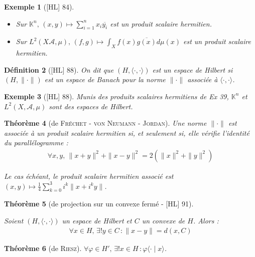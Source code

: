 \documentclass[10pt, a4paper, parskip=full, twoside, twocolumn]{report}
\newtheorem{definition}{Définition}
\newtheorem{theorem}[definition]{Théorème}
\newtheorem{example}[definition]{Exemple}
\newcommand{\IK}{\mathbb{K}}
\newcommand{\A}{\mathcal{A}}
\begin{document}
\begin{example}[\textnormal{[HL] 84}]
	\begin{itemize}
		\item Sur $\IK^n,\, (x,y)\mapsto \sum_{i=1}^{n} x_i \overline{y_i}$ est un produit scalaire hermitien.
		\item Sur $L^2(X\A,\mu),\, (f,g)\mapsto \int_Xf(x)\overline{g(x)}d\mu(x)$ est un produit scalaire hermitien.
	\end{itemize}
\end{example}

\begin{definition}[\textnormal{[HL] 88}]
	On dit que $(H, \langle\cdot,\cdot\rangle)$ est un \emph{espace de Hilbert} si $(H,\|\cdot\|)$ est 
	un espace de Banach pour la norme $\|\cdot\|$ associée à $\langle\cdot,\cdot\rangle$.
\end{definition}

\begin{example}[\textnormal{[HL] 88}]
	Munis des produits scalaires hermitiens de Ex 39, $\IK^n$ et $L^2(X,\A,\mu)$ sont des espaces de Hilbert.
\end{example}

\begin{theorem}[de \textsc{Fréchet - von Neumann - Jordan}]
	Une norme $\|\cdot\|$ est associée à un produit scalaire hermitien si, et seulement si, elle vérifie l'identité du parallélogramme :
	\begin{align*}
		\forall x,y,\, \|x+y\|^2 + \|x-y\|^2 = 2(\|x\|^2 + \|y\|^2)
	\end{align*}

	Le cas échéant, le produit scalaire hermitien associé est $(x,y)\mapsto \frac{1}{4}\sum_{k=0}^{3} i^k\|x+i^ky\|$.
\end{theorem}

\begin{tcolorbox}[
    breakable, %
    colback=developpement, %
    colframe=gray!0!black, %
    boxrule=0pt, %
    arc=1mm, %
	boxsep=0pt,
	left=0pt, right=0pt, top=0pt, bottom=0pt
]
\begin{theorem}[de projection sur un convexe fermé - \textnormal{[HL] 91}]
	\label{208dev21}

	Soient $(H,\langle\cdot,\cdot\rangle)$ un espace de Hilbert et $C$ un convexe de $H$. Alors :
	\begin{align*}
		\forall x\in H,\, \exists ! y\in C\,\colon \|x-y\| = d(x,C)
	\end{align*}
\end{theorem}

\begin{theorem}[de \textsc{Riesz}]
	\label{208dev22}
	$\forall\varphi \in H',\, \exists ! x\in H\,\colon \varphi\langle \cdot \mid x\rangle$.
\end{theorem}
\end{tcolorbox}
\end{document}
